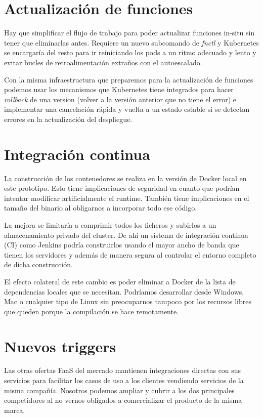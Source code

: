 \section{Actualización de funciones}

Hay que simplificar el flujo de trabajo para poder actualizar funciones in-situ sin tener que eliminarlas antes. Requiere un nuevo subcomando de \emph{fnctl} y Kubernetes se encargaría del resto para ir reiniciando los pods a un ritmo adecuado y lento y evitar bucles de retroalimentación extraños con el autoescalado.

Con la misma infraestructura que preparemos para la actualización de funciones podemos usar los mecanismos que Kubernetes tiene integrados para hacer \emph{rollback} de una version (volver a la versión anterior que no tiene el error) e implementar una cancelación rápida y vuelta a un estado estable si se detectan errores en la actualización del despliegue.

\section{Integración continua}

La construcción de los contenedores se realiza en la versión de Docker local en este prototipo. Esto tiene implicaciones de seguridad en cuanto que podrían intentar modificar artificialmente el runtime. También tiene implicaciones en el tamaño del binario al obligarnos a incorporar todo ese código.

La mejora se limitaría a comprimir todos los ficheros y subirlos a un almacenamiento privado del cluster. De ahí un sistema de integración continua (CI) como Jenkins\cite{jenkins} podría construirlos usando el mayor ancho de banda que tienen los servidores y además de manera segura al controlar el entorno completo de dicha construcción.

El efecto colateral de este cambio es poder eliminar a Docker de la lista de dependencias locales que se necesitan. Podríamos desarrollar desde Windows, Mac o cualquier tipo de Linux sin preocuparnos tampoco por los recursos libres que queden porque la compilación se hace remotamente.

\section{Nuevos triggers}
\label{sec:nuevos-triggers}

Las otras ofertas FaaS del mercado mantienen integraciones directas con sus servicios para facilitar los casos de uso a los clientes vendiendo servicios de la misma compañía. Nosotros podemos ampliar y cubrir a los dos principales competidores al no vernos obligados a comercializar el producto de la misma marca.

